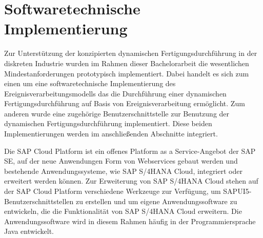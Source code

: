 \chapter{Softwaretechnische Implementierung}\label{ch:Implementierung}
Zur Unterstützung der konzipierten dynamischen Fertigungsdurchführung in der diskreten Industrie wurden im Rahmen dieser Bachelorarbeit die wesentlichen Mindestanforderungen prototypisch implementiert. 
Dabei handelt es sich zum einen um eine softwaretechnische Implementierung des Ereignisverarbeitungsmodells das die Durchführung einer dynamischen Fertigungsdurchführung auf Basis von Ereignisverarbeitung ermöglicht. 
Zum anderen wurde eine zugehörige Benutzerschnittstelle zur Benutzung der dynamischen Fertigungsdurchführung implementiert. Diese beiden Implementierungen werden im anschließenden Abschnitte integriert.

Die SAP Cloud Platform ist ein offenes Platform as a Service-Angebot der SAP SE, auf der neue Anwendungen Form von Webservices gebaut werden und bestehende Anwendungssysteme, wie SAP S/4HANA Cloud,  integriert oder erweitert werden können.
\cite{Schneider.2018}
Zur Erweiterung von SAP S/4HANA Cloud stehen auf der SAP Cloud Platform verschiedene Werkzeuge zur Verfügung, um SAPUI5-Benutzerschnittstellen zu erstellen und um eigene
Anwendungssoftware zu entwickeln, die die Funktionalität von SAP S/4HANA Cloud
erweitern. Die Anwendungssoftware wird in diesem Rahmen häufig in der Programmiersprache Java entwickelt.
\cite{Schneider.2018}



